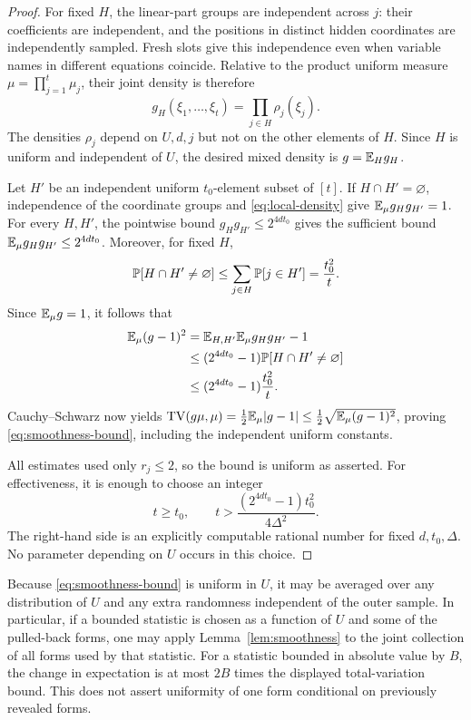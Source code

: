 \begin{proof}
For fixed $H$, the linear-part groups are independent across $j$:
their coefficients are independent, and the positions in distinct hidden
coordinates are independently sampled. Fresh slots give this independence
even when variable names in different equations coincide. Relative to
the product uniform measure $\mu=\prod_{j=1}^t\mu_j$, their joint density
is therefore
\[
 g_H(\xi_1,\ldots,\xi_t)=\prod_{j\in H}\rho_j(\xi_j).
\]
The densities $\rho_j$ depend on $U,d,j$ but not on the other elements
of $H$. Since $H$ is uniform and independent of $U$, the desired mixed
density is $g=\mathbb E_H g_H$.

Let $H'$ be an independent uniform $t_0$-element subset of $[t]$.
If $H\cap H'=\varnothing$, independence of the coordinate groups and
\eqref{eq:local-density} give
$\mathbb E_\mu g_Hg_{H'}=1$. For every $H,H'$, the pointwise bound
$g_Hg_{H'}\le2^{4dt_0}$ gives the sufficient bound
$\mathbb E_\mu g_Hg_{H'}\le2^{4dt_0}$. Moreover, for fixed $H$,
\[
 \mathbb P[H\cap H'\ne\varnothing]
 \le\sum_{j\in H}\mathbb P[j\in H']
 =\frac{t_0^2}{t}.
\]
Since $\mathbb E_\mu g=1$, it follows that
\begin{align*}
 \mathbb E_\mu(g-1)^2
 &=\mathbb E_{H,H'}\mathbb E_\mu g_Hg_{H'}-1\\
 &\le(2^{4dt_0}-1)\mathbb P[H\cap H'\ne\varnothing]\\
 &\le(2^{4dt_0}-1)\frac{t_0^2}{t}.
\end{align*}
Cauchy--Schwarz now yields
$\operatorname{TV}(g\mu,\mu)=\frac12\mathbb E_\mu\lvert g-1\rvert
\le\frac12\sqrt{\mathbb E_\mu(g-1)^2}$, proving
\eqref{eq:smoothness-bound}, including the independent uniform constants.

All estimates used only $r_j\le2$, so the bound is uniform as asserted.
For effectiveness, it is enough to choose an integer
\[
 t\ge t_0,\qquad
 t>\frac{(2^{4dt_0}-1)t_0^2}{4\Delta^2}.
\]
The right-hand side is an explicitly computable rational number for fixed
$d,t_0,\Delta$. No parameter depending on $U$ occurs in this choice.
\end{proof}

\begin{remark}\label{rem:joint-smoothness-use}
Because \eqref{eq:smoothness-bound} is uniform in $U$, it may be averaged
over any distribution of $U$ and any extra randomness independent of the
outer sample. In particular, if a bounded statistic is chosen as a function
of $U$ and some of the pulled-back forms, one may apply Lemma~\ref{lem:smoothness} to the
joint collection of all forms used by that statistic. For a statistic
bounded in absolute value by $B$, the change in expectation is at most
$2B$ times the displayed total-variation bound. This does not assert
uniformity of one form conditional on previously revealed forms.
\end{remark}

